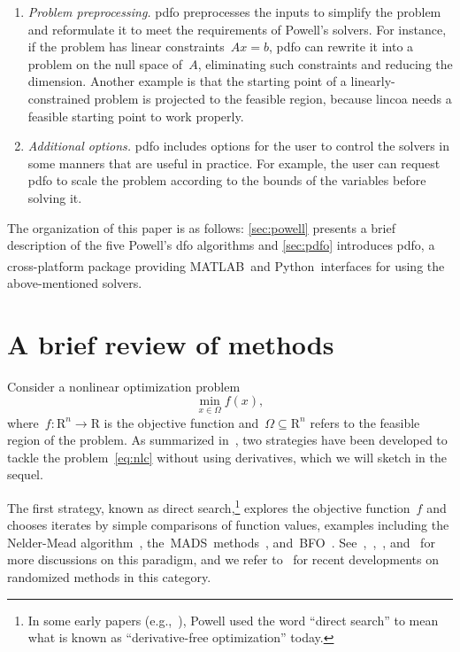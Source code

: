 \documentclass[11pt,draft]{article}
\numberwithin{equation}{section}
\def\R{\ensuremath{\mathds{R}}}
\def\obj{\ensuremath{f}}
\def\srchsp{\ensuremath{\Omega}}
\def\R{\mbox{R}}
\def\bfo{\mbox{BFO}}
\def\mads{\mbox{MADS}}
\def\matlab{\mbox{MATLAB\textsuperscript{\textregistered}}}
\def\python{\mbox{Python}}
\begin{document}
\begin{enumerate}
    \item \emph{Problem preprocessing.}
    \gls{pdfo} preprocesses the inputs to simplify the problem and reformulate it to meet the requirements of Powell's solvers.
    For instance, if the problem has linear constraints~$A x = b$, \gls{pdfo} can rewrite it into a problem on the null space of~$A$, eliminating such constraints and reducing the dimension.
    Another example is that the starting point of a linearly-constrained problem is projected to the feasible region, because \gls{lincoa} needs a feasible starting point to work properly.

    \item \emph{Additional options.}
    \gls{pdfo} includes options for the user to control the solvers in some manners that are useful in practice.
    For example, the user can request \gls{pdfo} to scale the problem according to the bounds of the variables before solving it.

\end{enumerate}

The organization of this paper is as follows: \cref{sec:powell} presents a brief description of the five Powell's \gls{dfo} algorithms and \cref{sec:pdfo} introduces \gls{pdfo}, a cross-platform package providing \matlab\ and \python\ interfaces for using the above-mentioned solvers.

\section{A brief review of  methods}

Consider a nonlinear optimization problem
\begin{equation}
    \label{eq:nlc}
    \min_{x \in \srchsp} \obj(x),
\end{equation}
where~$\obj \colon \R^n \to \R$ is the objective function and~$\srchsp \subseteq \R^n$ refers to the feasible region of the problem.
As summarized in~\cite{Conn_Scheinberg_Vicente_2009b}, two strategies have been developed to tackle the problem~\eqref{eq:nlc} without using derivatives, which we will sketch in the sequel.

The first strategy, known as {direct search},\footnote{In some early papers
(e.g.,~\cite{Powell_1994,Powell_1998}), Powell used the word ``direct search'' to mean what is known
as ``derivative-free optimization'' today.} explores the objective function~$\obj$ and chooses
iterates by simple comparisons of function values, examples including the Nelder-Mead
algorithm~\cite{Nelder_Mead_1965}, the~\mads\ methods~\cite{Audet_Dennis_2006, Abramson_Audet_2006,
Digabel_2011}, and~\bfo~\cite{Porcelli_Toint_2017,Porcelli_Toint_2020b,Porcelli_Toint_2021}.
See~\cite{Kolda_Lewis_Torczon_2003},~\cite[Chapters~7
and~8]{Conn_Scheinberg_Vicente_2009b},~\cite[Part~3]{Audet_Hare_2017},
and~\cite[Section~2.1]{Larson_Menickelly_Wild_2019} for more discussions on this paradigm,
and we refer to~\cite{Gratton_Etal_2015, Gratton_Etal_2019} for recent developments on randomized methods in
this category.
\end{document}
